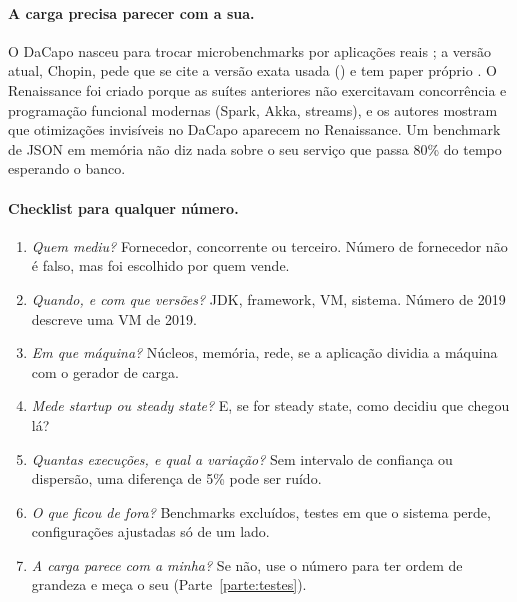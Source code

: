 \paragraph{A carga precisa parecer com a sua.}
O DaCapo nasceu para trocar microbenchmarks por aplicações reais
\parencite{paper:dacapo}; a versão atual, Chopin, pede que se cite a
versão exata usada () e tem paper próprio
\parencite{paper:dacapo-chopin}. O Renaissance
\parencite{paper:renaissance} foi criado porque as suítes anteriores
não exercitavam concorrência e programação funcional modernas (Spark,
Akka, streams), e os autores mostram que otimizações invisíveis no DaCapo
aparecem no Renaissance. Um benchmark de JSON em memória não diz nada
sobre o seu serviço que passa 80\% do tempo esperando o banco.

\paragraph{Checklist para qualquer número.}
\begin{enumerate}
\item \emph{Quem mediu?} Fornecedor, concorrente ou terceiro. Número de
  fornecedor não é falso, mas foi escolhido por quem vende.
\item \emph{Quando, e com que versões?} JDK, framework, VM, sistema.
  Número de 2019 descreve uma VM de 2019.
\item \emph{Em que máquina?} Núcleos, memória, rede, se a aplicação
  dividia a máquina com o gerador de carga.
\item \emph{Mede startup ou steady state?} E, se for steady state, como
  decidiu que chegou lá?
\item \emph{Quantas execuções, e qual a variação?} Sem intervalo de
  confiança ou dispersão, uma diferença de 5\% pode ser ruído.
\item \emph{O que ficou de fora?} Benchmarks excluídos, testes em que o
  sistema perde, configurações ajustadas só de um lado.
\item \emph{A carga parece com a minha?} Se não, use o número para ter
  ordem de grandeza e meça o seu (Parte~\ref{parte:testes}).
\end{enumerate}
